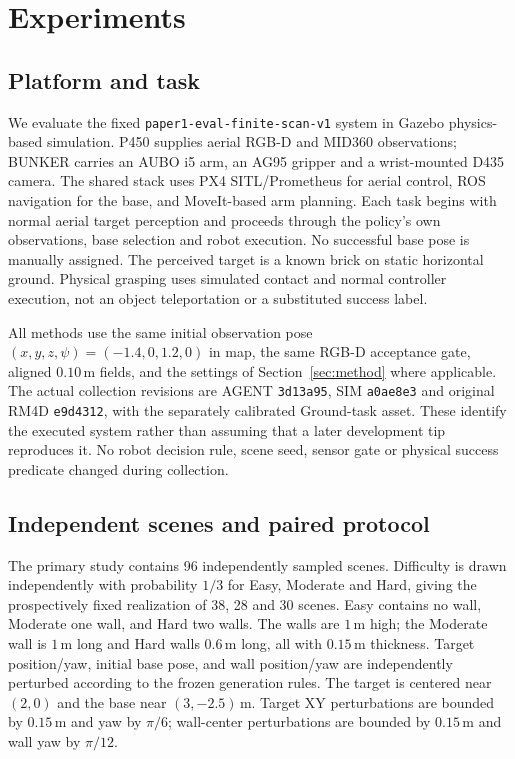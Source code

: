 \section{Experiments}
\label{sec:experiments}
\subsection{Platform and task}
We evaluate the fixed \texttt{paper1-eval-finite-scan-v1} system in Gazebo
physics-based simulation. P450 supplies aerial RGB-D and MID360 observations;
BUNKER carries an AUBO i5 arm, an AG95 gripper and a wrist-mounted D435 camera.
The shared stack uses PX4 SITL/Prometheus for aerial control, ROS navigation
for the base, and MoveIt-based arm planning. Each task begins with normal aerial
target perception and proceeds through the policy's own observations, base
selection and robot execution. No successful base pose is manually assigned.
The perceived target is a known brick on static horizontal ground. Physical
grasping uses simulated contact and normal controller execution, not an object
teleportation or a substituted success label.

All methods use the same initial observation pose
$(x,y,z,\psi)=(-1.4,0,1.2,0)$ in map, the same RGB-D acceptance gate, aligned
$0.10\,\mathrm{m}$ fields, and the settings of Section~\ref{sec:method} where
applicable. The actual collection revisions are AGENT \texttt{3d13a95},
SIM \texttt{a0ae8e3} and original RM4D \texttt{e9d4312}, with the separately
calibrated Ground-task asset. These identify the executed system rather than
assuming that a later development tip reproduces it. No robot decision rule,
scene seed, sensor gate or physical success predicate changed during collection.

\subsection{Independent scenes and paired protocol}
\label{sec:scenes}
The primary study contains 96 independently sampled scenes. Difficulty is drawn
independently with probability $1/3$ for Easy, Moderate and Hard, giving the
prospectively fixed realization of 38, 28 and 30 scenes. Easy contains no wall,
Moderate one wall, and Hard two walls. The walls are $1\,\mathrm{m}$ high;
the Moderate wall is $1\,\mathrm{m}$ long and Hard walls $0.6\,\mathrm{m}$ long,
all with $0.15\,\mathrm{m}$ thickness. Target position/yaw, initial base pose,
and wall position/yaw are independently perturbed according to the frozen
generation rules. The target is centered near $(2,0)$ and the base near
$(3,-2.5)\,\mathrm{m}$. Target XY perturbations are bounded by $0.15\,\mathrm{m}$
and yaw by $\pi/6$; wall-center perturbations are bounded by
$0.15\,\mathrm{m}$ and wall yaw by $\pi/12$.

